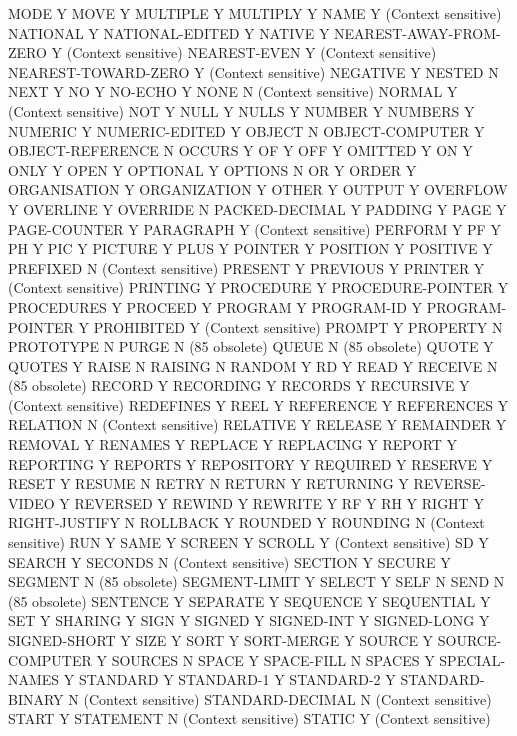 MODE				Y
MOVE				Y
MULTIPLE			Y
MULTIPLY			Y
NAME				Y (Context sensitive)
NATIONAL			Y
NATIONAL-EDITED			Y
NATIVE				Y
NEAREST-AWAY-FROM-ZERO		Y (Context sensitive)
NEAREST-EVEN			Y (Context sensitive)
NEAREST-TOWARD-ZERO		Y (Context sensitive)
NEGATIVE			Y
NESTED				N
NEXT				Y
NO				Y
NO-ECHO				Y
NONE				N (Context sensitive)
NORMAL				Y (Context sensitive)
NOT				Y
NULL				Y
NULLS				Y
NUMBER				Y
NUMBERS				Y
NUMERIC				Y
NUMERIC-EDITED			Y
OBJECT				N
OBJECT-COMPUTER			Y
OBJECT-REFERENCE		N
OCCURS				Y
OF				Y
OFF				Y
OMITTED				Y
ON				Y
ONLY				Y
OPEN				Y
OPTIONAL			Y
OPTIONS				N
OR				Y
ORDER				Y
ORGANISATION			Y
ORGANIZATION			Y
OTHER				Y
OUTPUT				Y
OVERFLOW			Y
OVERLINE			Y
OVERRIDE			N
PACKED-DECIMAL			Y
PADDING				Y
PAGE				Y
PAGE-COUNTER			Y
PARAGRAPH			Y (Context sensitive)
PERFORM				Y
PF				Y
PH				Y
PIC				Y
PICTURE				Y
PLUS				Y
POINTER				Y
POSITION			Y
POSITIVE			Y
PREFIXED			N (Context sensitive)
PRESENT				Y
PREVIOUS			Y
PRINTER				Y (Context sensitive)
PRINTING			Y
PROCEDURE			Y
PROCEDURE-POINTER		Y
PROCEDURES			Y
PROCEED				Y
PROGRAM				Y
PROGRAM-ID			Y
PROGRAM-POINTER			Y
PROHIBITED			Y (Context sensitive)
PROMPT				Y
PROPERTY			N
PROTOTYPE			N
PURGE				N (85 obsolete)
QUEUE				N (85 obsolete)
QUOTE				Y
QUOTES				Y
RAISE				N
RAISING				N
RANDOM				Y
RD				Y
READ				Y
RECEIVE				N (85 obsolete)
RECORD				Y
RECORDING			Y
RECORDS				Y
RECURSIVE			Y (Context sensitive)
REDEFINES			Y
REEL				Y
REFERENCE			Y
REFERENCES			Y
RELATION			N (Context sensitive)
RELATIVE			Y
RELEASE				Y
REMAINDER			Y
REMOVAL				Y
RENAMES				Y
REPLACE				Y
REPLACING			Y
REPORT				Y
REPORTING			Y
REPORTS				Y
REPOSITORY			Y
REQUIRED			Y
RESERVE				Y
RESET				Y
RESUME				N
RETRY				N
RETURN				Y
RETURNING			Y
REVERSE-VIDEO			Y
REVERSED			Y
REWIND				Y
REWRITE				Y
RF				Y
RH				Y
RIGHT				Y
RIGHT-JUSTIFY			N
ROLLBACK			Y
ROUNDED				Y
ROUNDING			N (Context sensitive)
RUN				Y
SAME				Y
SCREEN				Y
SCROLL				Y (Context sensitive)
SD				Y
SEARCH				Y
SECONDS				N (Context sensitive)
SECTION				Y
SECURE				Y
SEGMENT				N (85 obsolete)
SEGMENT-LIMIT			Y
SELECT				Y
SELF				N
SEND				N (85 obsolete)
SENTENCE			Y
SEPARATE			Y
SEQUENCE			Y
SEQUENTIAL			Y
SET				Y
SHARING				Y
SIGN				Y
SIGNED				Y
SIGNED-INT			Y
SIGNED-LONG			Y
SIGNED-SHORT			Y
SIZE				Y
SORT				Y
SORT-MERGE			Y
SOURCE				Y
SOURCE-COMPUTER			Y
SOURCES				N
SPACE				Y
SPACE-FILL			N
SPACES				Y
SPECIAL-NAMES			Y
STANDARD			Y
STANDARD-1			Y
STANDARD-2			Y
STANDARD-BINARY			N (Context sensitive)
STANDARD-DECIMAL		N (Context sensitive)
START				Y
STATEMENT			N (Context sensitive)
STATIC				Y (Context sensitive)
